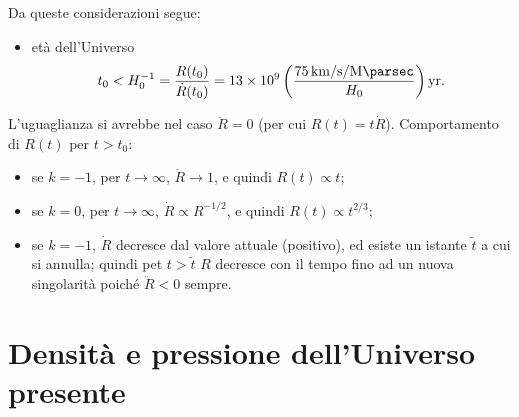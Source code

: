 Da queste considerazioni segue:
\begin{itemize}
\item età dell'Universo
  \begin{equation}
    t_0 < H_0^{-1}  = \frac {R(t_0)}{\dot{R}(t_0)} =  \num{13e9}
    \left(\frac{\SI[per-mode=reciprocal]{75}{\kilo\metre\per\second\per\mega\parsec}}{H_0}\right)
    \si{yr}.
  \end{equation}
\end{itemize}
L'uguaglianza si avrebbe nel caso $\ddot{R} =0$ (per cui $R(t)=t \dot{R}$).
Comportamento di $R(t)$ per $t>t_0$:
\begin{itemize}
\item se $k=-1$, per $t \to \infty$, $\dot{R} \to 1$, e quindi $R(t) \propto t$;
\item se $k=0$, per $t \to \infty$, $\dot{R} \propto R^{-1/2}$, e quindi
  $R(t) \propto t^{2/3}$;
\item se $k=-1$, $\dot{R}$ decresce dal valore attuale (positivo), ed esiste un
  istante $\tilde{t}$ a cui si annulla; quindi pet $t>\tilde{t}$ ${R}$ decresce
  con il tempo fino ad un nuova singolarità poiché $\ddot {R} <0$ sempre.
\end{itemize}

\section{Densità e pressione dell'Universo presente}


